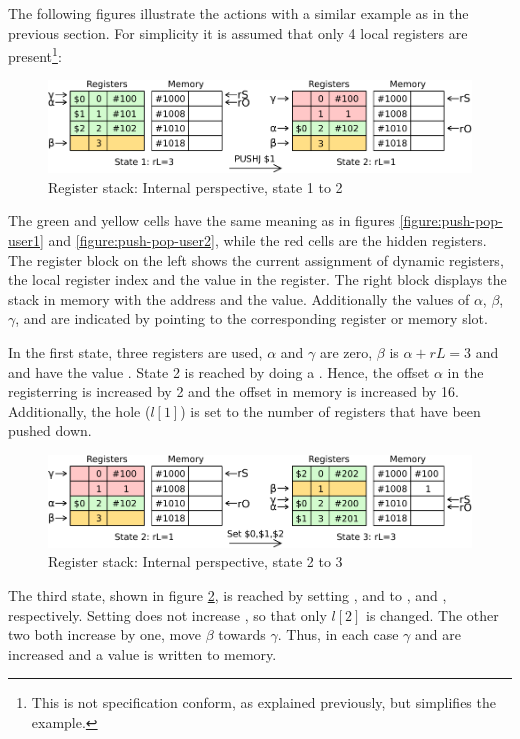 The following figures illustrate the actions with a similar example as in the previous section. For simplicity it is assumed that only 4 local registers are present\footnote{This is not specification conform, as explained previously, but simplifies the example.}:
\begin{figure}[H]
	\centering
	\includegraphics[width=\textwidth]{img/push-pop-internal1-crop.pdf}
	\caption{Register stack: Internal perspective, state 1 to 2}
	\label{figure:push-pop-internal1}
\end{figure}
\noindent The green and yellow cells have the same meaning as in figures \ref{figure:push-pop-user1} and \ref{figure:push-pop-user2}, while the red cells are the hidden registers. The register block on the left shows the current assignment of dynamic registers, the local register index and the value in the register. The right block displays the stack in memory with the address and the value. Additionally the values of $\alpha$, $\beta$, $\gamma$,  and  are indicated by pointing to the corresponding register or memory slot.

In the first state, three registers are used, $\alpha$ and $\gamma$ are zero, $\beta$ is $\alpha+rL = 3$ and  and  have the value . State 2 is reached by doing a . Hence, the offset $\alpha$ in the registerring is increased by 2 and the offset  in memory is increased by 16. Additionally, the hole ($l[1]$) is set to the number of registers that have been pushed down.

\begin{figure}[H]
	\centering
	\includegraphics[width=\textwidth]{img/push-pop-internal2-crop.pdf}
	\caption{Register stack: Internal perspective, state 2 to 3}
	\label{figure:push-pop-internal2}
\end{figure}
\noindent The third state, shown in figure \ref{figure:push-pop-internal2}, is reached by setting ,  and  to ,  and , respectively. Setting  does not increase , so that only $l[2]$ is changed. The other two both increase  by one, \ie move $\beta$ towards $\gamma$. Thus, in each case $\gamma$ and  are increased and a value is written to memory.

